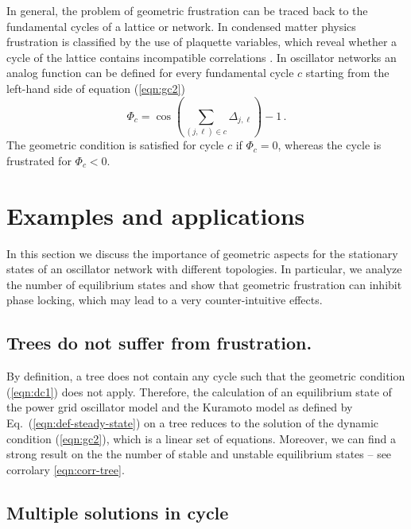 \documentclass[10pt,aps,pre,preprint,superscriptaddress]{revtex4-1}
\newcommand{\be}{\begin{equation}}
\newcommand{\ee}{\end{equation}}
\begin{document}
In general, the problem of geometric frustration can be traced back to the 
fundamental cycles of a lattice or network. In condensed matter physics 
frustration is classified by the use of plaquette variables, which reveal 
whether a cycle of the lattice contains incompatible correlations \cite{Toul80}. 
In oscillator networks an analog function can be defined for every fundamental 
cycle $c$ starting from the left-hand side of equation (\ref{eqn:gc2}) 
\be
   \Phi_c = \cos \left(\sum_{(j,\ell) \in c} \Delta_{j,\ell} \right) - 1 \, .
   \label{eq:phifun}
\ee
The geometric condition is satisfied for cycle $c$ if $\Phi_c = 0$, whereas 
the cycle is frustrated for $\Phi_c < 0$.
   

\section{Examples and applications}

In this section we discuss the importance of geometric aspects 
for the stationary states of an oscillator network with different
topologies. In particular, we analyze the number of equilibrium
states and show that geometric frustration can inhibit phase 
locking, which may lead to a very counter-intuitive effects.


\subsection{Trees do not suffer from frustration.}

By definition, a tree does not contain any cycle such that
the geometric condition (\ref{eqn:dc1}) does not apply. 
Therefore, the calculation of an equilibrium state  of the 
power grid oscillator model and the Kuramoto model 
as defined by Eq.~(\ref{eqn:def-steady-state})
on a tree reduces to the solution of the dynamic condition 
(\ref{eqn:gc2}), which is a linear set of equations. 
Moreover, we can find a strong result on the 
the number of stable and unstable equilibrium 
states -- see corrolary \ref{eqn:corr-tree}.



\subsection{Multiple solutions in cycle}
\end{document}
